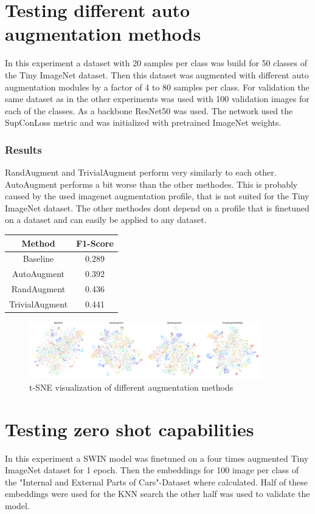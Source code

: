 \documentclass[12pt,a4paper]{report}
\newcommand{\splitlayout}[2]{
	\begin{minipage}{0.6\textwidth}
		#1
	\end{minipage}
	\hfill
	\begin{minipage}{0.35\textwidth}
		#2
	\end{minipage}	
}
\begin{document}
\newpage

\section{Testing different auto augmentation methods}
In this experiment a dataset with 20 samples per class was build for 50 classes of the Tiny ImageNet dataset.
Then this dataset was augmented with different auto augmentation modules by a factor of 4 to 80 samples per class.
For validation the same dataset as in the other experiments was used with 100 validation images for each of the classes.
As a backbone ResNet50 was used.
The network used the SupConLoss metric and was initialized with pretrained ImageNet weights.

\subsubsection{Results}
\splitlayout{
	RandAugment and TrivialAugment perform very similarly to each other.
	AutoAugment performs a bit worse than the other methodes.
	This is probably caused by the used imagenet augmentation profile, that is not suited for the Tiny ImageNet dataset.
	The other methodes dont depend on a profile that is finetuned on a dataset and can easily be applied to any dataset. 
}{
	\begin{tabular}{ | c | c | }
		\hline
		Method &  F1-Score \\ 
		\hline
		Baseline &  0.289  \\ 
		\hline
		AutoAugment & 0.392 \\ 
		\hline
		RandAugment & 0.436 \\ 
		\hline
		TrivialAugment & 0.441  \\ 
		\hline
	\end{tabular}
}

\begin{figure}[hb]
	\centering
	\includegraphics[width=0.9\textwidth]{../plots/augmentation_methods.png}
	\caption{t-SNE visualization of different augmentation methods}
\end{figure}

\newpage

\section{Testing zero shot capabilities}
In this experiment a SWIN model was finetuned on a four times augmented Tiny ImageNet dataset for 1 epoch.
Then the embeddings for 100 image per class of the "Internal and External Parts of Cars"-Dataset where calculated.
Half of these embeddings were used for the KNN search the other half was used to validate the model.
\end{document}
